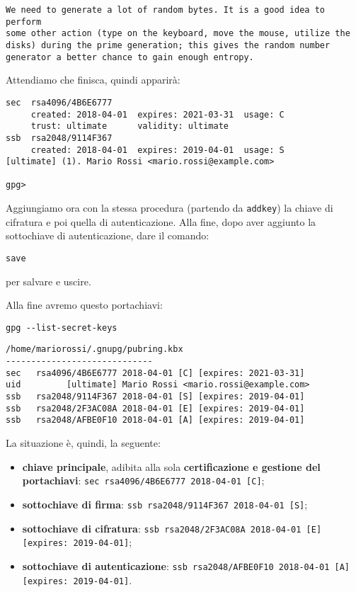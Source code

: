 \documentclass[a4paper,10pt]{article}
\begin{document}
\begin{lstlisting}
We need to generate a lot of random bytes. It is a good idea to perform
some other action (type on the keyboard, move the mouse, utilize the
disks) during the prime generation; this gives the random number
generator a better chance to gain enough entropy.
\end{lstlisting}


Attendiamo che finisca, quindi apparirà:

\begin{lstlisting}
sec  rsa4096/4B6E6777
     created: 2018-04-01  expires: 2021-03-31  usage: C
     trust: ultimate      validity: ultimate
ssb  rsa2048/9114F367
     created: 2018-04-01  expires: 2019-04-01  usage: S
[ultimate] (1). Mario Rossi <mario.rossi@example.com>

gpg>
\end{lstlisting}


Aggiungiamo ora con la stessa procedura (partendo da \texttt{addkey}) la chiave di cifratura e poi quella di autenticazione.
Alla fine, dopo aver aggiunto la sottochiave di autenticazione, dare il comando:

\begin{lstlisting}
save
\end{lstlisting}

per salvare e uscire.

Alla fine avremo questo portachiavi:

\begin{lstlisting}
gpg --list-secret-keys
\end{lstlisting}


\begin{lstlisting}
/home/mariorossi/.gnupg/pubring.kbx
-----------------------------
sec   rsa4096/4B6E6777 2018-04-01 [C] [expires: 2021-03-31]
uid         [ultimate] Mario Rossi <mario.rossi@example.com>
ssb   rsa2048/9114F367 2018-04-01 [S] [expires: 2019-04-01]
ssb   rsa2048/2F3AC08A 2018-04-01 [E] [expires: 2019-04-01]
ssb   rsa2048/AFBE0F10 2018-04-01 [A] [expires: 2019-04-01]
\end{lstlisting}

La situazione è, quindi, la seguente:

\begin{itemize}
 \item \textbf{chiave principale}, adibita alla sola \textbf{certificazione e gestione del portachiavi}: \newline \texttt{sec   rsa4096/4B6E6777 2018-04-01 [C]};
 \item \textbf{sottochiave di firma}: \newline \texttt{ssb   rsa2048/9114F367 2018-04-01 [S]};
 \item \textbf{sottochiave di cifratura}: \newline \texttt{ssb   rsa2048/2F3AC08A 2018-04-01 [E] [expires: 2019-04-01]};
 \item \textbf{sottochiave di autenticazione}: \newline \texttt{ssb   rsa2048/AFBE0F10 2018-04-01 [A] [expires: 2019-04-01]}.
\end{itemize}
\end{document}
